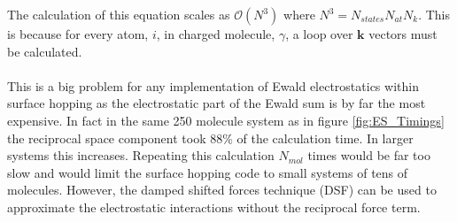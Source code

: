 \noindent The calculation of this equation scales as $\mathcal{O}(N^3)$ where $N^3 = N_{states} N_{at} N_{k}$. This   is because for every atom, $i$, in charged molecule, $\gamma$, a loop over $\mathbf{k}$ vectors must be calculated.   
\\\\
This is a big problem for any implementation of Ewald electrostatics within surface hopping as the electrostatic part of the Ewald sum is by far the most expensive. In fact in the same 250 molecule system as in figure \ref{fig:ES_Timings} the reciprocal space component took 88\% of the calculation time. In larger systems this increases. Repeating this calculation $N_{mol}$ times would be far too slow and would limit the surface hopping code to small systems of tens of molecules. However, the damped shifted forces technique (DSF) \cite{DSF} can be used to approximate the electrostatic interactions without the reciprocal force term. 
